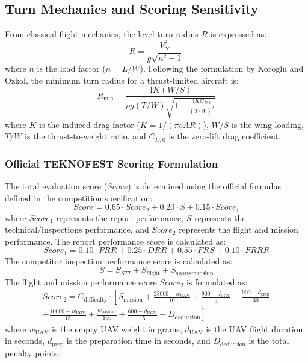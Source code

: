 \documentclass[11pt]{article}
\begin{document}
\subsection{Turn Mechanics and Scoring Sensitivity}
From classical flight mechanics, the level turn radius $R$ is expressed as:
\begin{equation}
    R = \frac{V_{\infty}^2}{g \sqrt{n^2 - 1}}
\end{equation}
where $n$ is the load factor ($n = L/W$). Following the formulation by Koroglu and Ozkol, the minimum turn radius for a thrust-limited aircraft is:
\begin{equation}
    R_{\text{min}} = \frac{4 K (W/S)}{\rho g (T/W) \sqrt{1 - \frac{4 K C_{D,0}}{(T/W)^2}}}
\end{equation}
where $K$ is the induced drag factor ($K = 1 / (\pi e AR)$), $W/S$ is the wing loading, $T/W$ is the thrust-to-weight ratio, and $C_{D,0}$ is the zero-lift drag coefficient.

\subsubsection{Official TEKNOFEST Scoring Formulation}
The total evaluation score ($Score$) is determined using the official formulas defined in the competition specification:
\begin{equation}
    Score = 0.65 \cdot Score_2 + 0.20 \cdot S + 0.15 \cdot Score_1
\end{equation}
where $Score_1$ represents the report performance, $S$ represents the technical/inspections performance, and $Score_2$ represents the flight and mission performance. The report performance score is calculated as:
\begin{equation}
    Score_1 = 0.10 \cdot PRR + 0.25 \cdot DRR + 0.55 \cdot FRS + 0.10 \cdot FRRR
\end{equation}
The competitor inspection performance score is calculated as:
\begin{equation}
    S = S_{STI} + S_{\text{flight}} + S_{\text{sportsmanship}}
\end{equation}
The flight and mission performance score $Score_2$ is formulated as:
\begin{equation}
\begin{split}
    Score_2 = C_{\text{difficulty}} \cdot \left[ S_{\text{mission}} + \frac{25000 - w_{\text{UAV}}}{10} + \frac{900 - d_{\text{UAV}}}{5} + \frac{900 - d_{\text{prep}}}{30} \right. \\
    \left. + \frac{10000 - w_{\text{UGV}}}{15} + \frac{w_{\text{payload}}}{100} + \frac{600 - d_{\text{UGV}}}{15} - D_{\text{deduction}} \right]
\end{split}
\end{equation}
where $w_{\text{UAV}}$ is the empty UAV weight in grams, $d_{\text{UAV}}$ is the UAV flight duration in seconds, $d_{\text{prep}}$ is the preparation time in seconds, and $D_{\text{deduction}}$ is the total penalty points. 
\end{document}
